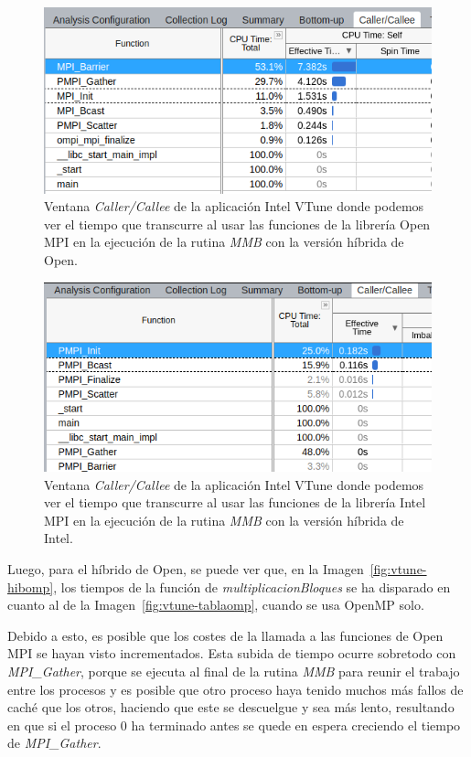 \documentclass[a4paper,12pt]{article}
\begin{document}
\begin{figure}[htbp]
    \includegraphics[scale=0.7]{./images/vtunehibmpi.png}
    \centering
    \caption{ Ventana {\it Caller/Callee} de la aplicación Intel VTune donde podemos ver el tiempo que transcurre al usar las funciones de la librería Open MPI en la ejecución de la rutina {\it MMB} con la versión híbrida de Open.}
    \label{fig:vtune-hibmpi}
\end{figure}

\begin{figure}[htbp]
    \includegraphics[scale=0.7]{./images/vtuneihibimpi.png}
    \centering
    \caption{Ventana {\it Caller/Callee} de la aplicación Intel VTune donde podemos ver el tiempo que transcurre al usar las funciones de la librería Intel MPI en la ejecución de la rutina {\it MMB} con la versión híbrida de Intel.}
    \label{fig:vtune-ihibmpi}
\end{figure}

Luego, para el híbrido de Open, se puede ver que, en la Imagen~\ref{fig:vtune-hibomp}, los tiempos de la función de {\it multiplicacionBloques} se ha disparado en cuanto al de la Imagen~\ref{fig:vtune-tablaomp}, cuando se usa OpenMP solo. 


Debido a esto, es posible que los costes de la llamada a las funciones de Open MPI se hayan visto incrementados. Esta subida de tiempo ocurre sobretodo con {\it MPI\_Gather}, porque se ejecuta al final de la rutina {\it MMB} para reunir el trabajo entre los procesos y es posible que otro proceso haya tenido muchos más fallos de caché que los otros, haciendo que este se descuelgue y sea más lento, resultando en que si el proceso 0 ha terminado antes se quede en espera creciendo el tiempo de {\it MPI\_Gather}. 
\end{document}
